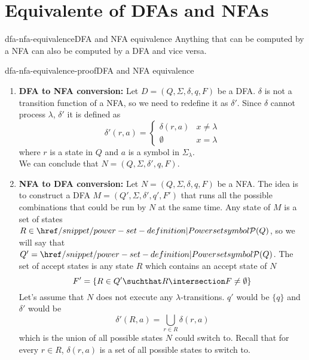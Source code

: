 \documentclass[preview]{standalone}
\newcommand{\emptyString}{\lambda}
\begin{document}
\genpage


\section{Equivalente of DFAs and NFAs}

\begin{snippettheorem}{dfa-nfa-equivalence}{DFA and NFA equivalence}
    Anything that can be computed by a NFA can also be computed by a DFA and vice versa.
\end{snippettheorem}

\begin{snippetproof}{dfa-nfa-equivalence-proof}{DFA and NFA equivalence}
    \begin{enumerate}
        \item \textbf{DFA to NFA conversion:}
        Let \(D=(Q, \Sigma, \delta, q, F)\) be a DFA.
        \(\delta\) is not a transition function of a NFA, so we need to redefine it as \(\delta'\).
        Since \(\delta\) cannot process \(\emptyString\), \(\delta'\)
        it is defined as
        \[
            \delta'(r, a)=
            \begin{cases} 
                \delta(r, a) & x \neq \emptyString \\
                \emptyset & x = \emptyString
            \end{cases}
        \]
        where \(r\) is a state in \(Q\) and \(a\) is a symbol in \(\Sigma_\emptyString\). \\
        We can conclude that \(N=(Q, \Sigma, \delta', q, F)\).
        \item \textbf{NFA to DFA conversion:}
        Let \(N=(Q, \Sigma, \delta, q, F)\) be a NFA. The idea is to construct a DFA \(M=(Q', \Sigma, \delta', q', F')\)
        that runs all the possible combinations that could be run by \(N\) at the same time.
        Any state of \(M\) is a set of states \(R \in \powerset(Q)\), so we will say that
        \(Q'=\powerset(Q)\). The set of accept states is any state \(R\) which contains an accept
        state of \(N\)
        \[
            F' = \{R \in Q' \suchthat R \intersection F \neq \emptyset\}
        \]
        Let's assume that \(N\) does not execute any \(\emptyString\)-transitions.
        \(q'\) would be \(\{q\}\) and \(\delta'\) would be
        \[
            \delta'(R, a) = \bigcup_{r\in R}\delta(r,a)
        \]
        which is the union of all possible states \(N\) could switch to.
        Recall that for every \(r\in R\), \(\delta(r,a)\) is a set
        of all possible states to switch to.
        

\end{enumerate}
\end{snippetproof}
\end{document}
